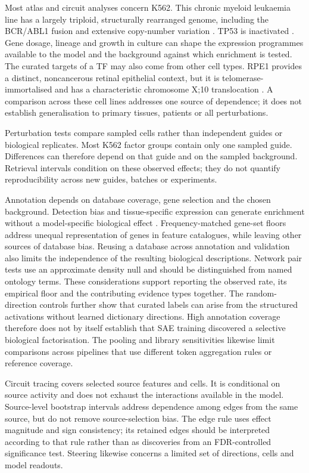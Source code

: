 \documentclass[review,authoryear,12pt]{elsarticle}
\begin{document}
Most atlas and circuit analyses concern K562. This chronic myeloid leukaemia line has a largely
triploid, structurally rearranged genome, including the BCR/ABL1 fusion and extensive copy-number
variation \citep{refK562Genome}. TP53 is inactivated \citep{refK562TP53}.
Gene dosage, lineage and growth in culture can shape the expression programmes available to the
model and the background against which enrichment is tested. The curated targets of a TF may also
come from other cell types. RPE1 provides a distinct, noncancerous retinal epithelial context, but it
is telomerase-immortalised and has a characteristic chromosome X;10 translocation
\citep{refRPE1Genome}. A comparison across these cell lines addresses one source of dependence;
it does not establish generalisation to primary tissues, patients or all perturbations.

Perturbation tests compare sampled cells rather than independent guides or biological replicates.
Most K562 factor groups contain only one sampled guide. Differences can therefore depend on that
guide and on the sampled background. Retrieval intervals condition on these observed effects;
they do not quantify reproducibility across new guides, batches or experiments.

Annotation depends on database coverage, gene selection and the chosen background. Detection bias
and tissue-specific expression can generate enrichment without a model-specific biological effect
\citep{refEnrichmentBias}. Frequency-matched gene-set floors address unequal representation of genes
in feature catalogues, while leaving other sources of database bias. Reusing a database across
annotation and validation also limits the independence of the resulting biological descriptions.
Network pair tests use an approximate density null and should be distinguished from named ontology
terms. These considerations support reporting the observed rate, its empirical floor and the
contributing evidence types together.
The random-direction controls further show that curated labels can arise from the structured
activations without learned dictionary directions. High annotation coverage therefore does not
by itself establish that SAE training discovered a selective biological factorisation.
The pooling and library sensitivities likewise limit comparisons across pipelines that use
different token aggregation rules or reference coverage.

Circuit tracing covers selected source features and cells. It is conditional on source activity and
does not exhaust the interactions available in the model. Source-level bootstrap intervals address
dependence among edges from the same source, but do not remove source-selection bias. The edge
rule uses effect magnitude and sign consistency; its retained edges should be interpreted according
to that rule rather than as discoveries from an FDR-controlled significance test. Steering likewise
concerns a limited set of directions, cells and model readouts.
\end{document}
